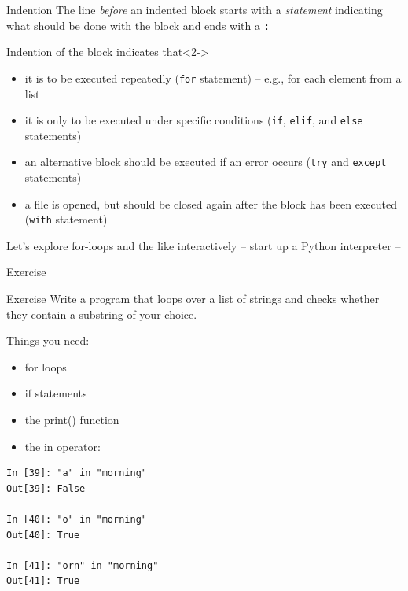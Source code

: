 \documentclass{beamer}
\begin{document}
\begin{frame}{Indention}
The line \emph{before} an indented block starts with a \emph{statement} indicating what should be done with the block and ends with a \texttt{:}

\begin{block}{Indention of the block indicates that}<2->
\begin{itemize}
\item<3-> it is to be executed repeatedly (\texttt{for} statement) – e.g., for each element from a list
\item<4-> it is only to be executed under specific conditions (\texttt{if}, \texttt{elif}, and \texttt{else} statements)
\item<5-> an alternative block should be executed if an error occurs (\texttt{try} and \texttt{except} statements)
\item<6-> a file is opened, but should be closed again after the block has been executed (\texttt{with} statement)
\end{itemize}
\end{block}
\end{frame}


\begin{frame}{Let's explore for-loops and the like interactively}
	-- start up a Python interpreter --
\end{frame}



\begin{frame}[plain]
Exercise
\end{frame}




\begin{frame}[fragile]{Exercise}
Write a program that loops over a list of strings and checks whether they contain a substring of your choice.

Things you need:
\begin{itemize}
	\item for loops
	\item if statements
	\item the print() function
	\item the in operator:
\end{itemize}

	
\begin{lstlisting}
In [39]: "a" in "morning"
Out[39]: False

In [40]: "o" in "morning"
Out[40]: True

In [41]: "orn" in "morning"
Out[41]: True
\end{lstlisting}
\end{frame}
\end{document}
